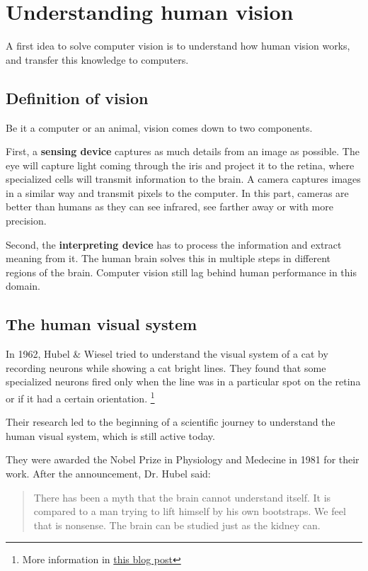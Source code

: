 \documentclass{article}
\begin{document}
\section{Understanding human vision} \label{solving}
A first idea to solve computer vision is to understand how human vision works, and transfer this knowledge to computers.

\subsection{Definition of vision}
Be it a computer or an animal, vision comes down to two components.

First, a \textbf{sensing device} captures as much details from an image as possible. The eye will capture light coming through the iris and project it to the retina, where specialized cells will transmit information to the brain. A camera captures images in a similar way and transmit pixels to the computer. In this part, cameras are better than humans as they can see infrared, see farther away or with more precision.

Second, the \textbf{interpreting device} has to process the information and extract meaning from it. The human brain solves this in multiple steps in different regions of the brain. Computer vision still lag behind human performance in this domain.

\subsection{The human visual system}

In 1962, Hubel \& Wiesel \cite{hubel} tried to understand the visual system of a cat by recording neurons while showing a cat bright lines. They found that some specialized neurons fired only when the line was in a particular spot on the retina or if it had a certain orientation.
\footnote{More information in \href{http://knowingneurons.com/2014/10/29/hubel-and-wiesel-the-neural-basis-of-visual-perception/}{this blog post}}

Their research led to the beginning of a scientific journey to understand the human visual system, which is still active today.

They were awarded the Nobel Prize in Physiology and Medecine in 1981 for their work. After the announcement, Dr. Hubel said:
\begin{quote}
There has been a myth that the brain cannot understand itself.  It is compared to a man trying to lift himself by his own bootstraps.  We feel that is nonsense.  The brain can be studied just as the kidney can.
\end{quote}
\end{document}
